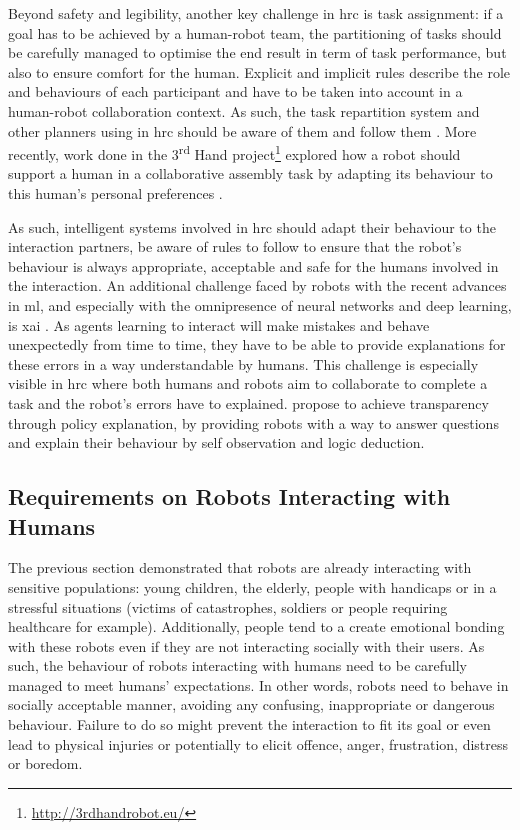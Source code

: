 	Beyond safety and legibility, another key challenge in \gls{hrc} is task assignment: if a goal has to be achieved by a human-robot team, the partitioning of tasks should be carefully managed to  optimise the end result in term of task performance, but also to ensure comfort for the human. Explicit and implicit rules describe the role and behaviours of each participant and have to be taken into account in a human-robot collaboration context. As such, the task repartition system and other planners using in \gls{hrc} should be aware of them and follow them \citep{montreuil2007planning}. More recently, work done in the 3\textsuperscript{rd} Hand project\footnote{\url{http://3rdhandrobot.eu/}} explored how a robot should support a human in a collaborative assembly task by adapting its behaviour to this human's personal preferences \citep{munzer2017efficient}.
	
	As such, intelligent systems involved in \gls{hrc} should adapt their behaviour to the interaction partners, be aware of rules to follow to ensure that the robot's behaviour is always appropriate, acceptable and safe for the humans involved in the interaction. An additional challenge faced by robots with the recent advances in \gls{ml}, and especially with the omnipresence of neural networks and deep learning, is \gls{xai} \citep{wachter2017transparent}. As agents learning to interact will make mistakes and behave unexpectedly from time to time, they have to be able to provide explanations for these errors in a way understandable by humans. This challenge is especially visible in \gls{hrc} where both humans and robots aim to collaborate to complete a task and the robot's errors have to explained. \cite{hayes2017improving} propose to achieve transparency through policy explanation, by providing robots with a way to answer questions and explain their behaviour by self observation and logic deduction.

\subsection{Requirements on Robots Interacting with Humans} \label{ssec:back_constraints}

    The previous section demonstrated that robots are already interacting with sensitive populations: young children, the elderly, people with handicaps or in a stressful situations (victims of catastrophes, soldiers or people requiring healthcare for example). Additionally, people tend to a create emotional bonding with these robots even if they are not interacting socially with their users. As such, the behaviour of robots interacting with humans need to be carefully managed to meet humans' expectations. In other words, robots need to behave in socially acceptable manner, avoiding any confusing, inappropriate or dangerous behaviour. Failure to do so might prevent the interaction to fit its goal or even lead to physical injuries or potentially to elicit offence, anger, frustration, distress or boredom. 
    
